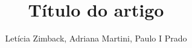 \documentclass{article}
\begin{document}
\title{Título do artigo}


\author{Letícia Zimback, Adriana Martini, Paulo I Prado}

\maketitle


\end{document}
